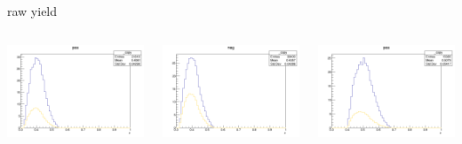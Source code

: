 \begin{frame}{raw yield}
\begin{columns}
\begin{column}[T]{0.25\textwidth}
\includegraphics[width = \textwidth]{results/yield/statistics/yield_x_Q2_z_0.50_3.979_0.40_pos.png}
\end{column}
\begin{column}[T]{0.25\textwidth}
\includegraphics[width = \textwidth]{results/yield/statistics/yield_x_Q2_z_0.50_3.979_0.40_neg.png}
\end{column}
\begin{column}[T]{0.25\textwidth}
\includegraphics[width = \textwidth]{results/yield/statistics/yield_x_Q2_z_0.50_3.979_0.50_pos.png}

\end{column}
\end{columns}
\end{frame}
